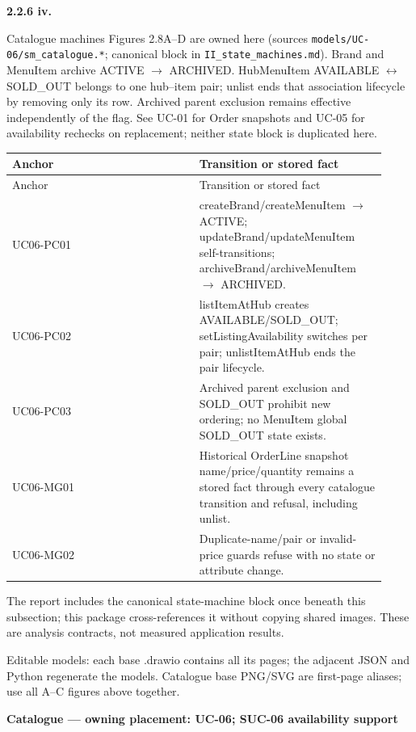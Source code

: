 \textbf{2.2.6 iv.}\par
Catalogue machines Figures 2.8A--D are owned here (sources \texttt{models/\allowbreak{}UC-06/\allowbreak{}sm\_\allowbreak{}catalogue.\allowbreak{}*}; canonical block in \texttt{II\_\allowbreak{}state\_\allowbreak{}machines.\allowbreak{}md}). Brand and MenuItem archive ACTIVE \ensuremath{\rightarrow} ARCHIVED. HubMenuItem AVAILABLE \ensuremath{\leftrightarrow} SOLD\_OUT belongs to one hub--item pair; unlist ends that association lifecycle by removing only its row. Archived parent exclusion remains effective independently of the flag. See UC-01 for Order snapshots and UC-05 for availability rechecks on replacement; neither state block is duplicated here.

\begin{longtable}{>{\raggedright\arraybackslash}p{0.4600\linewidth}>{\raggedright\arraybackslash}p{0.4600\linewidth}}
Anchor & Transition or stored fact \\
\hline\endfirsthead
Anchor & Transition or stored fact \\
\hline\endhead
UC06-PC01 & createBrand/createMenuItem \ensuremath{\rightarrow} ACTIVE; updateBrand/updateMenuItem self-transitions; archiveBrand/archiveMenuItem \ensuremath{\rightarrow} ARCHIVED. \\
UC06-PC02 & listItemAtHub creates AVAILABLE/SOLD\_OUT; setListingAvailability switches per pair; unlistItemAtHub ends the pair lifecycle. \\
UC06-PC03 & Archived parent exclusion and SOLD\_OUT prohibit new ordering; no MenuItem global SOLD\_OUT state exists. \\
UC06-MG01 & Historical OrderLine snapshot name/price/quantity remains a stored fact through every catalogue transition and refusal, including unlist. \\
UC06-MG02 & Duplicate-name/pair or invalid-price guards refuse with no state or attribute change. \\
\end{longtable}
The report includes the canonical state-machine block once beneath this subsection; this package cross-references it without copying shared images. These are analysis contracts, not measured application results.

Editable models: each base .drawio contains all its pages; the adjacent JSON and Python regenerate the models. Catalogue base PNG/SVG are first-page aliases; use all A--C figures above together.

\textbf{Catalogue --- owning placement: UC-06; SUC-06 availability support}

